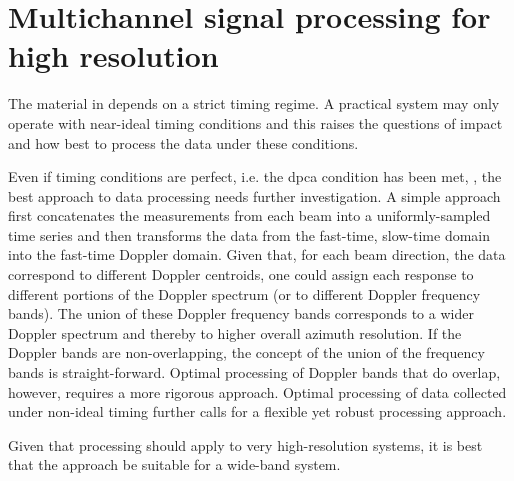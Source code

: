 \section{Multichannel signal processing for high resolution}
The material in  depends on a strict timing regime. A practical system may only operate with near-ideal timing conditions and this raises the questions of impact and how best to process the data under these conditions. 
\par
Even if timing conditions are perfect, i.e. the \gls{dpca} condition has been met, \cite{Sikaneta2014}, the best approach to data processing needs further investigation. A simple approach first concatenates the measurements from each beam into a uniformly-sampled time series and then transforms the data from the fast-time, slow-time domain into the fast-time Doppler domain. Given that, for each beam direction, the data correspond to different Doppler centroids, one could assign each response to different portions of the Doppler spectrum (or to different Doppler frequency bands). The union of these Doppler frequency bands corresponds to a wider Doppler spectrum and thereby to higher overall azimuth resolution. If the Doppler bands are non-overlapping, the concept of the union of the frequency bands is straight-forward. Optimal processing of Doppler bands that do overlap, however, requires a more rigorous approach. Optimal processing of data collected under non-ideal timing further calls for a flexible yet robust processing approach.
\par
Given that processing should apply to very high-resolution systems, it is best that the approach be suitable for a wide-band system. 
